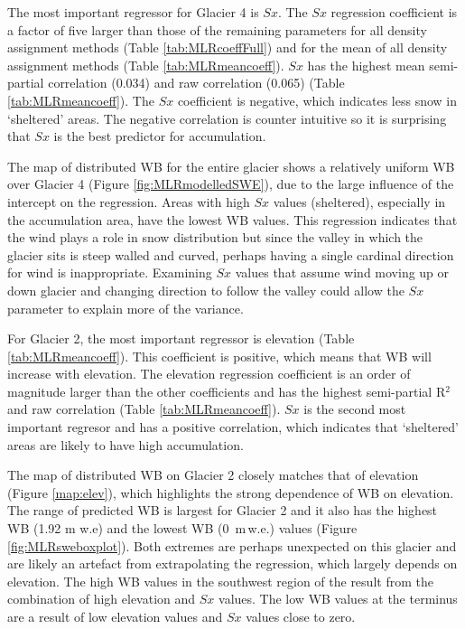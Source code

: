 \documentclass{sfuthesis}
\begin{document}
The most important regressor for Glacier 4 is $Sx$. The $Sx$ regression coefficient is a factor of five larger than those of the remaining parameters for all density assignment methods (Table \ref{tab:MLRcoeffFull}) and for the mean of all density assignment methods (Table \ref{tab:MLRmeancoeff}). $Sx$ has the highest mean semi-partial correlation (0.034)  and raw correlation (0.065) (Table \ref{tab:MLRmeancoeff}). The $Sx$ coefficient is negative, which indicates less snow in `sheltered' areas. The negative correlation is counter intuitive so it is surprising that $Sx$ is the best predictor for accumulation.

The map of distributed WB for the entire glacier shows a relatively uniform WB over Glacier 4 (Figure \ref{fig:MLRmodelledSWE}), due to the large influence of the intercept on the regression. Areas with high $Sx$ values (sheltered), especially in the accumulation area, have the lowest WB values. This regression indicates that the wind plays a role in snow distribution but since the valley in which the glacier sits is steep walled and curved, perhaps having a single cardinal direction for wind is inappropriate. Examining $Sx$ values that assume wind moving up or down glacier and changing direction to follow the valley could allow the $Sx$ parameter to explain more of the variance. 

For Glacier 2, the most important regressor is elevation (Table \ref{tab:MLRmeancoeff}). This coefficient is positive, which means that WB will increase with elevation. The elevation regression coefficient is an order of magnitude larger than the other coefficients and has the highest semi-partial R$^2$ and raw correlation (Table \ref{tab:MLRmeancoeff}). $Sx$ is the second most important regresor and has a positive correlation, which indicates that `sheltered' areas are likely to have high accumulation. 

The map of distributed WB on Glacier 2 closely matches that of elevation (Figure \ref{map:elev}), which highlights the strong dependence of WB on elevation. The range of predicted WB is largest for Glacier 2 and it also has the highest WB (1.92 m w.e) and the lowest WB (0 \,m\,w.e.) values (Figure \ref{fig:MLRsweboxplot}). Both extremes are perhaps unexpected on this glacier and are likely an artefact from extrapolating the regression, which largely depends on elevation. The high WB values in the southwest region of the result from the combination of high elevation and $Sx$ values. The low WB values at the terminus are a result of low elevation values and $Sx$ values close to zero. 
\end{document}
